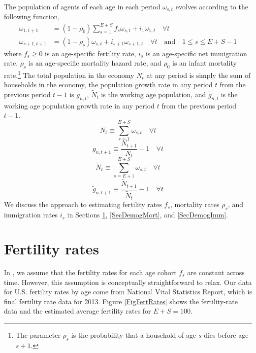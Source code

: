 The population of agents of each age in each period $\omega_{s,t}$ evolves according to the following function,
\begin{equation}\label{EqPopLawofmotion}
  \begin{split}
    \omega_{1,t+1} &= (1 - \rho_0)\sum_{s=1}^{E+S} f_s\omega_{s,t} + i_1\omega_{1,t}\quad\forall t \\
    \omega_{s+1,t+1} &= (1 - \rho_s)\omega_{s,t} + i_{s+1}\omega_{s+1,t}\quad\forall t\quad\text{and}\quad 1\leq s \leq E+S-1
  \end{split}
\end{equation}
where $f_s\geq 0$ is an age-specific fertility rate, $i_s$ is an age-specific net immigration rate, $\rho_s$ is an age-specific mortality hazard rate, and $\rho_0$ is an infant mortality rate.\footnote{The parameter $\rho_s$ is the probability that a household of age $s$ dies before age $s+1$.} The total population in the economy $N_t$ at any period is simply the sum of households in the economy, the population growth rate in any period $t$ from the previous period $t-1$ is $g_{n,t}$, $\tilde{N}_t$ is the working age population, and $\tilde{g}_{n,t}$ is the working age population growth rate in any period $t$ from the previous period $t-1$.
\begin{equation}\label{EqPopN}
  N_t\equiv\sum_{s=1}^{E+S} \omega_{s,t} \quad\forall t
\end{equation}
\begin{equation}\label{EqPopGrowth}
  g_{n,t+1} \equiv \frac{N_{t+1}}{N_t} - 1 \quad\forall t
\end{equation}
\begin{equation}\label{EqPopNtil}
  \tilde{N}_t\equiv\sum_{s=E+1}^{E+S} \omega_{s,t} \quad\forall t
\end{equation}
\begin{equation}\label{EqPopGrowthTil}
  \tilde{g}_{n,t+1} \equiv \frac{\tilde{N}_{t+1}}{\tilde{N}_t} - 1 \quad\forall t
\end{equation}
We discuss the approach to estimating fertility rates $f_s$, mortality rates $\rho_s$, and immigration rates $i_s$ in Sections \ref{SecDemogFert}, \ref{SecDemogMort}, and \ref{SecDemogImm}.


\section{Fertility rates}\label{SecDemogFert}

  In \ogindia, we assume that the fertility rates for each age cohort $f_s$ are constant across time. However, this assumption is conceptually straightforward to relax. Our data for U.S. fertility rates by age come from \citet[Table 3, p. 18]{MartinEtAl:2015} National Vital Statistics Report, which is final fertility rate data for 2013. Figure \ref{FigFertRates} shows the fertility-rate data and the estimated average fertility rates for $E+S=100$.

